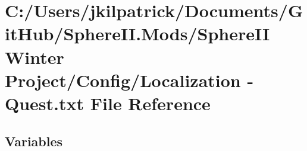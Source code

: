 \hypertarget{_sphere_i_i_01_winter_01_project_2_config_2_localization_01-_01_quest_8txt}{}\section{C\+:/\+Users/jkilpatrick/\+Documents/\+Git\+Hub/\+Sphere\+II.Mods/\+Sphere\+II Winter Project/\+Config/\+Localization -\/ Quest.\+txt File Reference}
\label{_sphere_i_i_01_winter_01_project_2_config_2_localization_01-_01_quest_8txt}
\subsection*{Variables}
